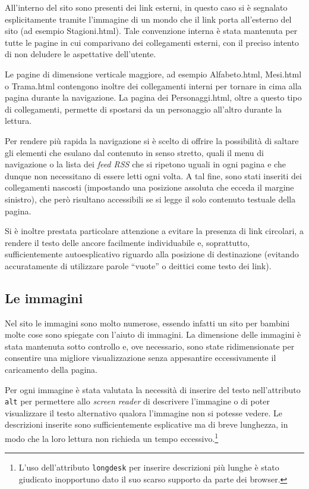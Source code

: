\documentclass[10pt,a4paper,onecolumn]{article}
\newcommand{\sitepage}[1]{\textsf{#1}}
\newcommand{\inglese}[1]{\foreignlanguage{english}{\itshape{}#1}}
\begin{document}
All'interno del sito sono presenti dei link esterni, in questo caso si è segnalato esplicitamente tramite l'immagine di un mondo che il link porta all'esterno del sito (ad esempio \sitepage{Stagioni.html}). Tale convenzione interna è stata mantenuta per tutte le pagine in cui comparivano dei collegamenti esterni, con il preciso intento di non deludere le aspettative dell'utente.

Le pagine di dimensione verticale maggiore, ad esempio \sitepage{Alfabeto.html}, \sitepage{Mesi.html} o \sitepage{Trama.html} contengono inoltre dei collegamenti interni per tornare in cima alla pagina durante la navigazione. La pagina dei \sitepage{Personaggi.html}, oltre a questo tipo di collegamenti, permette di spostarsi da un personaggio all'altro durante la lettura.

Per rendere più rapida la navigazione si è scelto di offrire la possibilità di saltare gli elementi che esulano dal contenuto in senso stretto, quali il menu di navigazione o la lista dei \inglese{feed RSS} che si ripetono uguali in ogni pagina e che dunque non necessitano di essere letti ogni volta. A tal fine, sono stati inseriti dei collegamenti nascosti (impostando una posizione assoluta che ecceda il margine sinistro), che però risultano accessibili se si legge il solo contenuto testuale della pagina.

Si è inoltre prestata particolare attenzione a evitare la presenza di link circolari, a rendere il testo delle ancore facilmente individuabile e, soprattutto, sufficientemente autoesplicativo riguardo alla posizione di destinazione (evitando accuratamente di utilizzare parole ``vuote'' o deittici come testo dei link).

\subsection{Le immagini}
Nel sito le immagini sono molto numerose, essendo infatti un sito per bambini molte cose sono spiegate con l'aiuto di immagini. La dimensione delle immagini è stata mantenuta sotto controllo e, ove necessario, sono state ridimensionate per consentire una migliore visualizzazione senza appesantire eccessivamente il caricamento della pagina.

Per ogni immagine è stata valutata la necessità di inserire del testo nell'attributo \texttt{alt} per permettere allo \inglese{screen reader} di descrivere l'immagine o di poter visualizzare il testo alternativo qualora l'immagine non si potesse vedere. Le descrizioni inserite sono sufficientemente esplicative ma di breve lunghezza, in modo che la loro lettura non richieda un tempo eccessivo.\footnote{%
    L'uso dell'attributo \texttt{longdesk} per inserire descrizioni più lunghe è stato giudicato inopportuno dato il suo scarso supporto da parte dei browser.
}
\end{document}
